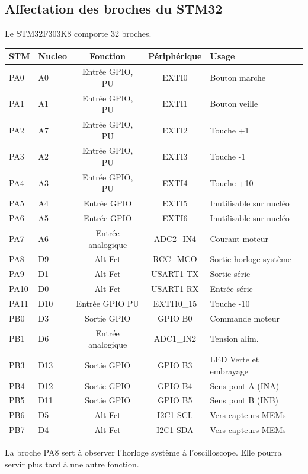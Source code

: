 \documentclass[a4paper,11pt]{report}
\begin{document}
\subsection{Affectation des broches du STM32}
Le STM32F303K8 comporte 32 broches.
\\
   \begin{tabular}{|l|l|c|c|l|}
   \hline
   STM & Nucleo& Fonction & Périphérique & Usage\\
   \hline
   PA0  & A0  & Entrée GPIO, PU   & EXTI0       & Bouton marche          \\
   PA1  & A1  & Entrée GPIO, PU   & EXTI1       & Bouton veille          \\
   PA2  & A7  & Entrée GPIO, PU   & EXTI2       & Touche +1              \\
   PA3  & A2  & Entrée GPIO, PU   & EXTI3       & Touche -1              \\
   PA4  & A3  & Entrée GPIO, PU   & EXTI4       & Touche +10             \\
   PA5  & A4  & Entrée GPIO       & EXTI5       & Inutilisable sur nucléo\\
   PA6  & A5  & Entrée GPIO       & EXTI6       & Inutilisable sur nucléo\\
   PA7  & A6  & Entrée analogique & ADC2\_IN4   & Courant moteur         \\
   PA8  & D9  & Alt Fct \no 0     & RCC\_MCO    & Sortie horloge système \\
   PA9  & D1  & Alt Fct \no 7     & USART1 TX   & Sortie série           \\
   PA10 & D0  & Alt Fct \no 7     & USART1 RX   & Entrée série           \\
   PA11 & D10 & Entrée GPIO PU    & EXTI10\_15  & Touche -10             \\
   PB0  & D3  & Sortie GPIO       & GPIO B0     & Commande moteur        \\
   PB1  & D6  & Entrée analogique & ADC1\_IN2   & Tension alim.          \\
   PB3  & D13 & Sortie GPIO       & GPIO B3     & LED Verte et embrayage \\
   PB4  & D12 & Sortie GPIO       & GPIO B4     & Sens pont A (INA)      \\
   PB5  & D11 & Sortie GPIO       & GPIO B5     & Sens pont B (INB)      \\
   PB6  & D5  & Alt Fct \no 4     & I2C1 SCL    & Vers capteurs MEMs     \\
   PB7  & D4  & Alt Fct \no 4     & I2C1 SDA    & Vers capteurs MEMs     \\
   \hline
\end{tabular}
   La broche PA8 sert à observer l'horloge système à l'oscilloscope. Elle pourra servir plus tard à une autre fonction.
\end{document}
